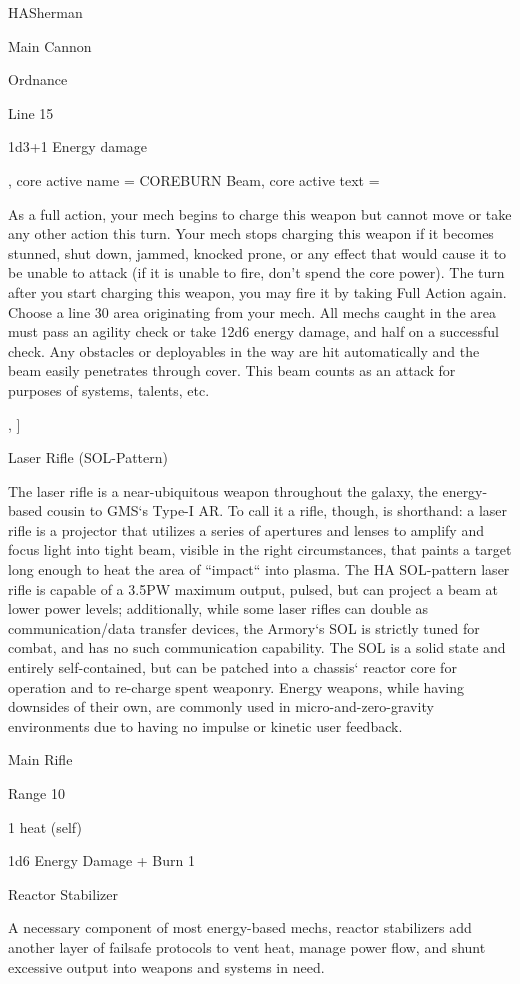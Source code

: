 \begin{mech}{HA}{Sherman}
{Main Cannon

Ordnance

Line 15

1d3+1 Energy damage},
core active name = COREBURN Beam,
core active text = {\FullAction

As a full action, your mech begins to charge this weapon but cannot move or take any other action this turn. Your mech stops charging this weapon if it becomes stunned, shut down, jammed, knocked prone, or any effect that would cause it to be unable to attack (if it is unable to fire, don’t spend the core power). The turn after you start charging this weapon, you may fire it by taking Full Action again. Choose a line 30 area originating from your mech. All mechs caught in the area must pass an agility check or take 12d6 energy damage, and half on a successful check. Any obstacles or deployables in the way are hit automatically and the beam easily penetrates through cover. This beam counts as an attack for purposes of systems, talents, etc.},
]

Laser Rifle (SOL-Pattern)

The laser rifle is a near-ubiquitous weapon throughout the galaxy, the energy-based cousin to GMS‘s Type-I AR. To call it a rifle, though, is shorthand: a laser rifle is a projector that utilizes a series of apertures and lenses to amplify and focus light into tight beam, visible in the right circumstances, that paints a target long enough to heat the area of “impact“ into plasma. The HA SOL-pattern laser rifle is capable of a 3.5PW maximum output, pulsed, but can project a beam at lower power levels; additionally, while some laser rifles can double as communication/data transfer devices, the Armory‘s SOL is strictly tuned for combat, and has no such communication capability. The SOL is a solid state and entirely self-contained, but can be patched into a chassis‘ reactor core for operation and to re-charge spent weaponry. Energy weapons, while having downsides of their own, are commonly used in micro-and-zero-gravity environments due to having no impulse or kinetic user feedback.

Main Rifle

Range 10

1 heat (self)

1d6 Energy Damage + Burn 1


Reactor Stabilizer

A necessary component of most energy-based mechs, reactor stabilizers add another layer of failsafe protocols to vent heat, manage power flow, and shunt excessive output into weapons and systems in need.


\end{mech}
